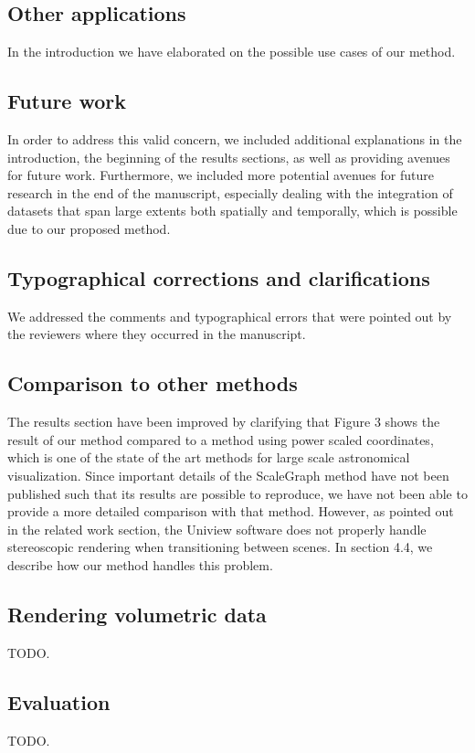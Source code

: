 \documentclass{article}
\begin{document}
\subsection{Other applications}\label{concern:applications}
In the introduction we have elaborated on the possible use cases of our method.

\subsection{Future work}\label{concern:future-work}
In order to address this valid concern, we included additional explanations in the
introduction, the beginning of the results sections, as well as providing avenues for
future work. Furthermore, we included more potential avenues for future research in the
end of the manuscript, especially dealing with the integration of datasets that span large
extents both spatially and temporally, which is possible due to our proposed method.

\subsection{Typographical corrections and clarifications}\label{concern:typos}
We addressed the comments and typographical errors that were pointed out by the reviewers where they occurred in the manuscript.

\subsection{Comparison to other methods}\label{concern:comparisons}
The results section have been improved by clarifying that Figure 3 shows the result of our method compared to a method using power scaled coordinates, which is one of the state of the art methods for large scale astronomical visualization. Since important details of the ScaleGraph method have not been published such that its results are possible to reproduce, we have not been able to provide a more detailed comparison with that method. However, as pointed out in the related work section, the Uniview software does not properly handle stereoscopic rendering when transitioning between scenes. In section 4.4, we describe how our method handles this problem.

\subsection{Rendering volumetric data}\label{concern:volumetric}
TODO.

\subsection{Evaluation}\label{concern:evaluation}
TODO.
\end{document}
